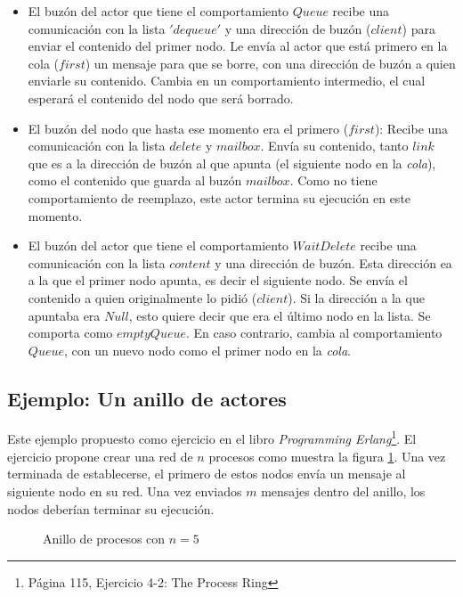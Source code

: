 \begin{itemize}
 \item El buzón del actor que tiene el comportamiento $Queue$ recibe una comunicación con la lista $'dequeue'$ y una dirección de buzón ($client$) para enviar el contenido del primer nodo.
 \subitem Le envía al actor que está primero en la cola ($first$) un mensaje para que se borre, con una dirección de buzón a quien enviarle su contenido.
 \subitem Cambia en un comportamiento intermedio, el cual esperará el contenido del nodo que será borrado.
 \item El buzón del nodo que hasta ese momento era el primero ($first$):
 \subitem Recibe una comunicación con la lista $delete$ y $mailbox$.
 \subitem Envía su contenido, tanto $link$ que es a la dirección de buzón al que apunta (el siguiente nodo en la \textit{cola}), como el contenido que guarda al buzón $mailbox$. Como no tiene comportamiento de reemplazo, este actor termina su ejecución en este momento.
 \item El buzón del actor que tiene el comportamiento $WaitDelete$ recibe una comunicación con la lista $content$ y una dirección de buzón. Esta dirección ea a la que el primer nodo apunta, es decir el siguiente nodo.
 \subitem Se envía el contenido a quien originalmente lo pidió ($client$).
 \subitem Si la dirección a la que apuntaba era $Null$, esto quiere decir que era el último nodo en la lista. Se comporta como $emptyQueue$.
 \subitem En caso contrario, cambia al comportamiento $Queue$, con un nuevo nodo como el primer nodo en la \textit{cola}.
\end{itemize}


\subsection{Ejemplo: Un anillo de actores}
Este ejemplo propuesto como ejercicio en el libro \textit{Programming Erlang}\cite{Cesarini:2009:EP:1717841}\footnote{Página 115, Ejercicio 4-2: The Process Ring}. El ejercicio propone crear una red de $n$ procesos como muestra la figura \ref{fig:anillo}. Una vez terminada de establecerse, el primero de estos nodos envía un mensaje al siguiente nodo en su red.  Una vez enviados $m$ mensajes dentro del anillo, los nodos deberían terminar su ejecución.

\begin{figure}[H]
\centering
{}
\caption{Anillo de procesos con $n=5$}
\label{fig:anillo}
\end{figure}

